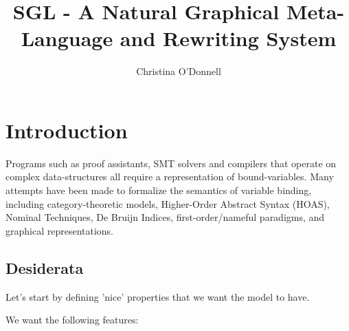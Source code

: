 \documentclass[]{lipics-v2021}
\title{SGL - A Natural Graphical Meta-Language and Rewriting System}
\author[1]{Christina O'Donnell }%
\affil[1]{Univerisity of Nottingham}
\begin{document}
\maketitle

\section{Introduction}
Programs such as proof assistants, SMT solvers and compilers that operate on
complex data-structures all require a representation of bound-variables. Many
attempts have been made to formalize the semantics of variable binding,
including category-theoretic models, Higher-Order Abstract Syntax (HOAS),
Nominal Techniques, De Bruijn Indices, first-order/nameful paradigms, and
graphical representations.

\subsection{Desiderata}
Let's start by defining 'nice' properties that we want the model to have.

We want the following features:

\end{document}
